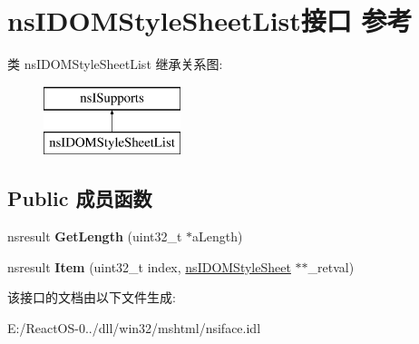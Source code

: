 \hypertarget{interfacens_i_d_o_m_style_sheet_list}{}\section{ns\+I\+D\+O\+M\+Style\+Sheet\+List接口 参考}
\label{interfacens_i_d_o_m_style_sheet_list}
类 ns\+I\+D\+O\+M\+Style\+Sheet\+List 继承关系图\+:\begin{figure}[H]
\begin{center}
\leavevmode
\includegraphics[height=2.000000cm]{interfacens_i_d_o_m_style_sheet_list}
\end{center}
\end{figure}
\subsection*{Public 成员函数}
\begin{DoxyCompactItemize}
\item 
\mbox{\label{interfacens_i_d_o_m_style_sheet_list_abbfe0e33ae921aedbdd5a187a6ebce9f}} 
nsresult {\bfseries Get\+Length} (uint32\+\_\+t $\ast$a\+Length)
\item 
\mbox{\label{interfacens_i_d_o_m_style_sheet_list_a767cd9132714e7a1eb68dd85b285afd1}} 
nsresult {\bfseries Item} (uint32\+\_\+t index, \hyperlink{interfacens_i_d_o_m_style_sheet}{ns\+I\+D\+O\+M\+Style\+Sheet} $\ast$$\ast$\+\_\+retval)
\end{DoxyCompactItemize}


该接口的文档由以下文件生成\+:\begin{DoxyCompactItemize}
\item 
E\+:/\+React\+O\+S-\/0../dll/win32/mshtml/nsiface.\+idl\end{DoxyCompactItemize}
